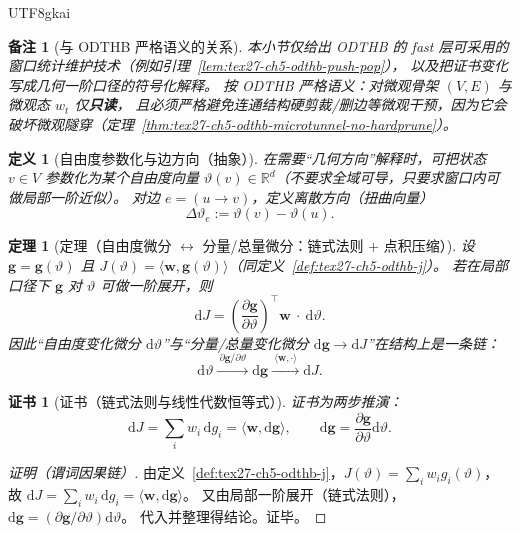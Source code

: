 \documentclass[12pt]{article}
\newtheorem{definition}{定义}[section]
\newtheorem{theorem}{定理}[section]
\newtheorem{remark}{备注}[section]
\newtheorem{Certificate}{证书}[section]
\newcommand{\RR}{\mathbb{R}}
\begin{document}
\begin{CJK*}{UTF8}{gkai}
\begin{remark}[与 ODTHB 严格语义的关系]
本小节仅给出 ODTHB 的 fast 层可采用的窗口统计维护技术（例如引理~\ref{lem:tex27-ch5-odthb-push-pop}），
以及把证书变化写成几何一阶口径的符号化解释。
按 ODTHB 严格语义：对微观骨架 $(V,E)$ 与微观态 $w_t$ 仅\textbf{只读}，
且必须严格避免连通结构硬剪裁/删边等微观干预，因为它会破坏微观隧穿（定理~\ref{thm:tex27-ch5-odthb-microtunnel-no-hardprune}）。
\end{remark}

\begin{definition}[自由度参数化与边方向（抽象）]
\label{def:tex27-ch5-odthb-theta}
在需要“几何方向”解释时，可把状态 $v\in V$ 参数化为某个自由度向量 $\vartheta(v)\in\RR^d$（不要求全域可导，只要求窗口内可做局部一阶近似）。
对边 $e=(u\to v)$，定义离散方向（扭曲向量）
\[
  \Delta\vartheta_e:=\vartheta(v)-\vartheta(u).
\]
\end{definition}

\begin{theorem}[定理（自由度微分 $\leftrightarrow$ 分量/总量微分：链式法则 + 点积压缩）]
\label{thm:tex27-ch5-odthb-differential}
设 $\mathbf{g}=\mathbf{g}(\vartheta)$ 且 $J(\vartheta)=\langle \mathbf{w},\mathbf{g}(\vartheta)\rangle$（同定义~\ref{def:tex27-ch5-odthb-j}）。
若在局部口径下 $\mathbf{g}$ 对 $\vartheta$ 可做一阶展开，则
\[
  \mathrm{d}J
  =\left(\frac{\partial\mathbf{g}}{\partial \vartheta}\right)^{\!\top}\mathbf{w}\ \cdot\ \mathrm{d}\vartheta.
\]
因此“自由度变化微分 $\mathrm{d}\vartheta$”与“分量/总量变化微分 $\mathrm{d}\mathbf{g}\to \mathrm{d}J$”在结构上是一条链：
\[
  \mathrm{d}\vartheta \xrightarrow{\ \partial\mathbf{g}/\partial\vartheta\ }\mathrm{d}\mathbf{g}
  \xrightarrow{\ \langle\mathbf{w},\cdot\rangle\ }\mathrm{d}J.
\]
\end{theorem}

\begin{Certificate}[证书（链式法则与线性代数恒等式）]
\label{cert:tex27-ch5-odthb-differential}
证书为两步推演：
\[
  \mathrm{d}J=\sum_i w_i\,\mathrm{d}g_i=\langle \mathbf{w},\mathrm{d}\mathbf{g}\rangle,
  \qquad
  \mathrm{d}\mathbf{g}=\frac{\partial\mathbf{g}}{\partial\vartheta}\mathrm{d}\vartheta.
\]
\end{Certificate}

\begin{proof}[证明（谓词因果链）]
由定义~\ref{def:tex27-ch5-odthb-j}，$J(\vartheta)=\sum_i w_i g_i(\vartheta)$，故
$
\mathrm{d}J=\sum_i w_i\,\mathrm{d}g_i=\langle \mathbf{w},\mathrm{d}\mathbf{g}\rangle
$。
又由局部一阶展开（链式法则），$\mathrm{d}\mathbf{g}=(\partial\mathbf{g}/\partial\vartheta)\mathrm{d}\vartheta$。
代入并整理得结论。证毕。
\end{proof}


\end{CJK*}
\end{document}
